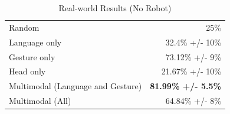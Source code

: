\documentclass[graybox]{svmult}
\begin{document}
%
%
\begin{table}
\caption{Real-world Results (No Robot)\label{table:real_results_no_robot}}
\centering
\begin{tabular}{lr}
\toprule
Random & 25\%\\
Language only &  32.4\% +/- 10\%\\
Gesture only  &  73.12\% +/- 9\%\\
Head only     &  21.67\% +/- 10\%\\
Multimodal (Language and Gesture) & {\bf 81.99\% +/- 5.5\%}\\
Multimodal (All) &  64.84\% +/- 8\%\\
\bottomrule
\end{tabular}
\end{table}
\end{document}
